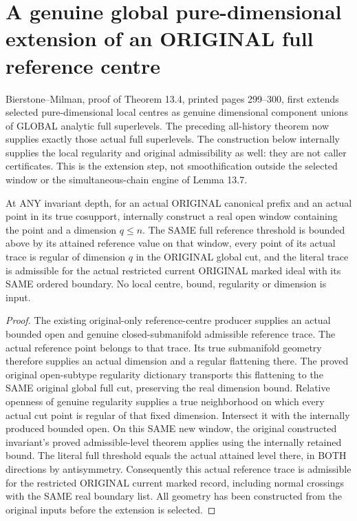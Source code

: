 \section{A genuine global pure-dimensional extension of an ORIGINAL full reference centre}

Bierstone--Milman\cite{bierstone-milman97-invent-math}, proof of Theorem
13.4, printed pages 299--300, first extends selected pure-dimensional local
centres as genuine dimensional component unions of GLOBAL analytic full
superlevels. The preceding all-history theorem now supplies exactly those
actual full superlevels. The construction below internally supplies the
local regularity and original admissibility as well: they are not caller
certificates. This is the extension step, not smoothification outside the
selected window or the simultaneous-chain engine of Lemma 13.7.

\begin{lemma}
\label{hir:original-full-reference-pure-admissible-window}
\leanok
At ANY invariant depth, for an actual ORIGINAL canonical prefix and an
actual point in its true cosupport, internally construct a real open
window containing the point and a dimension $q\le n$. The SAME full
reference threshold is bounded above by its attained reference value on
that window, every point of its actual trace is regular of dimension $q$
in the ORIGINAL global cut, and the literal trace is admissible for the
actual restricted current ORIGINAL marked ideal with its SAME ordered
boundary. No local centre, bound, regularity or dimension is input.
\end{lemma}
\begin{proof}
The existing original-only reference-centre producer supplies an actual
bounded open and genuine closed-submanifold admissible reference trace.
The actual reference point belongs to that trace. Its true submanifold
geometry therefore supplies an actual dimension and a regular flattening
there. The proved original open-subtype regularity dictionary transports
this flattening to the SAME original global full cut, preserving the real
dimension bound. Relative openness of genuine regularity supplies a true
neighborhood on which every actual cut point is regular of that fixed
dimension. Intersect it with the internally produced bounded open.
On this SAME new window, the original constructed invariant's proved
admissible-level theorem applies using the internally retained bound.
The literal full threshold equals the actual attained level there, in BOTH
directions by antisymmetry. Consequently this actual reference trace is
admissible for the restricted ORIGINAL current marked record, including
normal crossings with the SAME real boundary list. All geometry has been
constructed from the original inputs before the extension is selected.
\end{proof}


